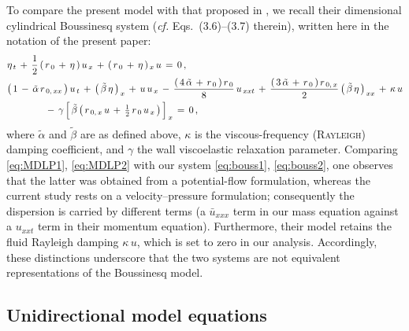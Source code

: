 \documentclass[alpha-refs, 12pt]{wiley-article}
\begin{document}
To compare the present model with that proposed in \citet{Mitsotakis2019}, we recall their dimensional cylindrical Boussinesq system (\emph{cf.} Eqs.~(3.6)--(3.7) therein), written here in the notation of the present paper:
\begin{align}
  & \eta_{\,t}\,+\,\frac{1}{2}\,(\,r_{\,0}\,+\,\eta\,)\,u_{\,x}\,+\,(\,r_{\,0}\,+\,\eta\,)_{\,x}\,u\,=\,0\,, \label{eq:MDLP1}\\
  & \bigl(\,1\,-\,\tilde{\alpha}\,r_{\,0,\,xx}\,\bigr)\,u_{\,t}\,+\,\bigl(\,\tilde{\beta}\,\eta\,\bigr)_{\,x}\,+\,u\,u_{\,x}\,-\,\frac{(\,4\,\tilde{\alpha}\,+\,r_{\,0}\,)\,r_{\,0}}{8}\,u_{\,xxt}\,+\,\frac{(\,3\,\tilde{\alpha}\,+\,r_{\,0}\,)\,r_{\,0,\,x}}{2}\,\bigl(\,\tilde{\beta}\,\eta\,\bigr)_{\,xx}\,+\,\kappa\,u \nonumber \\
  & \qquad\qquad -\,\gamma\,\Bigl[\,\tilde{\beta}\,\bigl(\,r_{\,0,\,x}\,u\,+\,\tfrac{1}{2}\,r_{\,0}\,u_{\,x}\,\bigr)\,\Bigr]_{\,x}\,=\,0\,, \label{eq:MDLP2}
\end{align}
where $\tilde{\alpha}$ and $\tilde{\beta}$ are as defined above, $\kappa$ is the viscous-frequency (\textsc{Rayleigh}) damping coefficient, and $\gamma$ the wall viscoelastic relaxation parameter. Comparing \eqref{eq:MDLP1}, \eqref{eq:MDLP2} with our system \eqref{eq:bouss1}, \eqref{eq:bouss2}, one observes that the latter was obtained from a potential-flow formulation, whereas the current study rests on a velocity--pressure formulation; consequently the dispersion is carried by different terms (a $\bar{u}_{xxx}$ term in our mass equation against a $u_{xxt}$ term in their momentum equation). Furthermore, their model retains the fluid Rayleigh damping $\kappa\,u$, which is set to zero in our analysis. Accordingly, these distinctions underscore that the two systems are not equivalent representations of the Boussinesq model.

\subsection{Unidirectional model equations}\label{sec:nondim}
\end{document}
